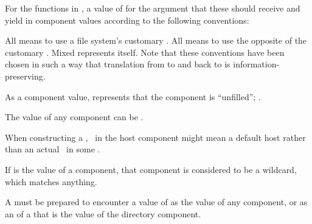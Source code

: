 For the functions in \figref\PathnameCaseFuns,
a value of  for the  argument 
that these  should receive 
and yield  in component values according to the following conventions:

\beginlist
\itemitem{\bull}
All  means to use a file system's customary .
\itemitem{\bull}
All  means to use the opposite of the customary .
\itemitem{\bull}
Mixed  represents itself.
\endlist
Note that these conventions have been chosen in such a way that translation
from  to  and back to  is information-preserving.
 
\endsubsubsubsubsection%

\endsubsubsubsection%

\endsubsubsection%




As a  component value,
\nil represents that the component is ``unfilled'';
\seesection\MergingPathnames.

The value of any  component can be \nil.

When constructing a ,
\nil\ in the host component might mean a default host
rather than an actual \nil\ in some .

\endsubsubsubsection%


If  is the value of a  component,
that component is considered to be a wildcard, which matches anything.

A  must be prepared to encounter a value of 
as the value of any  component,
or as an  of a  that is the value of the directory component.

